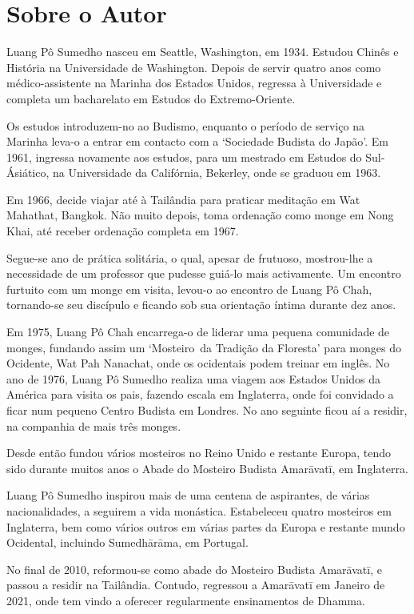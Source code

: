 \chapter{Sobre o Autor}

Luang Pô Sumedho nasceu em Seattle, Washington, em 1934. Estudou Chinês e
História na Universidade de Washington. Depois de servir quatro anos como
médico-assistente na Marinha dos Estados Unidos, regressa à Universidade e
completa um bacharelato em Estudos do Extremo-Oriente.

Os estudos introduzem-no ao Budismo, enquanto o período de serviço na Marinha
leva-o a entrar em contacto com a `Sociedade Budista do Japão'. Em 1961,
ingressa novamente aos estudos, para um mestrado em Estudos do Sul-Ásiático, na
Universidade da Califórnia, Bekerley, onde se graduou em 1963.

Em 1966, decide viajar até à Tailândia para praticar meditação em Wat Mahathat,
Bangkok. Não muito depois, toma ordenação como monge em Nong Khai, até receber 
ordenação completa em 1967.

Segue-se ano de prática solitária, o qual, apesar de frutuoso, mostrou-lhe a
necessidade de um professor que pudesse guiá-lo mais activamente. Um encontro
furtuito com um monge em visita, levou-o ao encontro de Luang Pô Chah,
tornando-se seu discípulo e ficando sob sua orientação íntima durante dez anos.

Em 1975, Luang Pô Chah encarrega-o de liderar uma pequena comunidade de monges,
fundando assim um `\mbox{Mosteiro}~da Tradição da Floresta' para monges do Ocidente,
Wat Pah Nanachat, onde os ocidentais podem treinar em inglês. No ano de 1976,
Luang Pô Sumedho realiza uma viagem aos Estados Unidos da América para visita os
pais, fazendo escala em Inglaterra, onde foi convidado a ficar num pequeno
Centro Budista em Londres. No ano seguinte ficou aí a residir, na companhia de
mais três monges.

Desde então fundou vários mosteiros no Reino Unido e restante Europa, tendo sido
durante muitos anos o Abade do Mosteiro Budista Amarāvatī, em Inglaterra.

Luang Pô Sumedho inspirou mais de uma centena de aspirantes, de várias
nacionalidades, a seguirem a vida monástica. Estabeleceu quatro mosteiros em
Inglaterra, bem como vários outros em várias partes da Europa e restante mundo
Ocidental, incluindo Sumedhārāma, em Portugal.

No final de 2010, reformou-se como abade do Mosteiro Budista Amarāvatī, e passou
a residir na Tailândia. Contudo, regressou a Amarāvatī em Janeiro de 2021, onde
tem vindo a oferecer regularmente ensinamentos de Dhamma.
